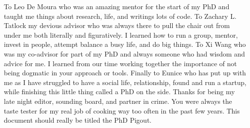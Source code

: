 To Leo De Moura who was an amazing mentor for the start of
    my PhD and taught me things about research, life, and writings lots of code.
To Zachary L. Tatlock my devious advisor who was always there
    to pull the chair out from under me both literally and figuratively.
I learned how to run a group, mentor, invest in people, attempt
    balance a busy life, and do big things.
To Xi Wang who was my co-advisor for part of my PhD
    and always someone who had wisdom and advice for me.
I learned from our time working together the importance of
    not being dogmatic in your approach or tools.
Finally to Eunice who has put up with me as I have struggled
    to have a social life, relationship, found and run a startup,
    while finishing this little thing called a PhD on the side.
Thanks for being my late night editor, sounding board, and
    partner in crime.
You were always the taste tester for my real job
    of cooking way too often in the past few years.
This document should really be titled the PhD Pigout.
